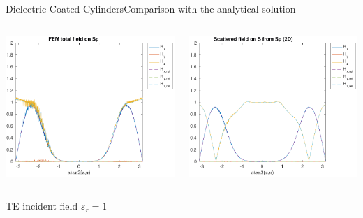 \begin{frame}[allowframebreaks]{Dielectric Coated Cylinders}{Comparison with the analytical solution }
\begin{columns}
      \includegraphics[width=\linewidth]{results/TMc4/H_Sp.pdf}

      \includegraphics[width=\linewidth]{results/TMc4/H_S.pdf}
      
    \end{columns}
    
    \framebreak

    \hfill TE incident field $\varepsilon_r=1$ \hfill\mbox{}
    

\end{frame}

